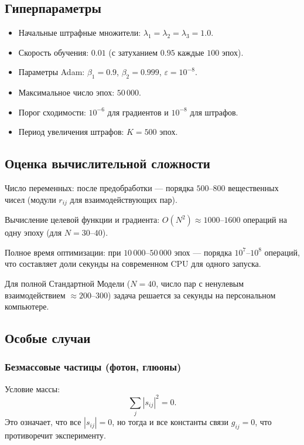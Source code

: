\documentclass[12pt,a4paper]{article}
\begin{document}
\subsection{Гиперпараметры}
\begin{itemize}
    \item Начальные штрафные множители: $\lambda_1 = \lambda_2 = \lambda_3 = 1.0$.
    \item Скорость обучения: $0.01$ (с затуханием $0.95$ каждые $100$ эпох).
    \item Параметры Adam: $\beta_1 = 0.9$, $\beta_2 = 0.999$, $\varepsilon = 10^{-8}$.
    \item Максимальное число эпох: $50\,000$.
    \item Порог сходимости: $10^{-6}$ для градиентов и $10^{-8}$ для штрафов.
    \item Период увеличения штрафов: $K = 500$ эпох.
\end{itemize}

\subsection{Оценка вычислительной сложности}
Число переменных: после предобработки --- порядка $500$--$800$ вещественных чисел (модули $r_{ij}$ для взаимодействующих пар).

Вычисление целевой функции и градиента: $O(N^2) \approx 1000$--$1600$ операций на одну эпоху (для $N = 30$--$40$).

Полное время оптимизации: при $10\,000$--$50\,000$ эпох --- порядка $10^7$--$10^8$ операций, что составляет доли секунды на современном CPU для одного запуска.

Для полной Стандартной Модели ($N = 40$, число пар с ненулевым взаимодействием $\approx 200$--$300$) задача решается за секунды на персональном компьютере.

\subsection{Особые случаи}

\subsubsection{Безмассовые частицы (фотон, глюоны)}
Условие массы:
\begin{equation}
    \sum_j |s_{ij}|^2 = 0.
\end{equation}
Это означает, что все $|s_{ij}| = 0$, но тогда и все константы связи $g_{ij} = 0$, что противоречит эксперименту.
\end{document}
